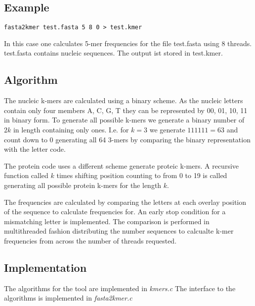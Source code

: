 \subsection{Example}

\begin{lstlisting}
fasta2kmer test.fasta 5 8 0 > test.kmer
\end{lstlisting}
In this case one calculates 5-mer frequencies for the file test.fasta
using 8 threads. test.fasta contains nucleic sequences. The output ist
stored in test.kmer.

\subsection{Algorithm}

The nucleic k-mers are calculated using a binary scheme. As the
nucleic letters contain only four members A, C, G, T they can be
represented by 00, 01, 10, 11 in binary form. To generate all possible
k-mers we generate a binary number of $2k$ in length containing only
ones. I.e. for $k=3$ we generate $111 111 = 63$ and count down to $0$
generating all 64 3-mers by comparing the binary representation with
the letter code.

The protein code uses a different scheme generate proteic k-mers.
A recursive function called $k$ times shifting position counting to
from 0 to 19 is called generating all possible protein k-mers for the
length $k$.

The frequencies are calculated by comparing the letters at each overlay
position of the sequence to calculate frequencies for. An early stop
condition for a mismatching letter is implemented. The comparison is
performed in multithreaded fashion distributing the number sequences to
calcualte k-mer frequencies from across the number of threads
requested.

\subsection{Implementation}

The algorithms for the tool are implemented in \emph{kmers.c}
The interface to the algorithms is implemented in \emph{fasta2kmer.c}
